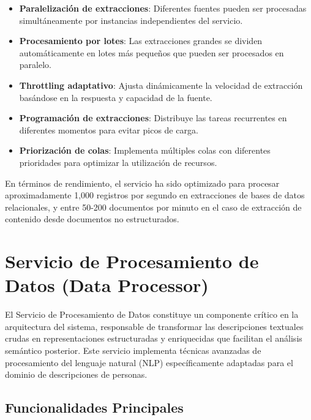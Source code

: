 \documentclass[12pt,a4paper]{article}
\begin{document}
\begin{itemize}
    \item \textbf{Paralelización de extracciones}: Diferentes fuentes pueden ser procesadas simultáneamente por instancias independientes del servicio.
    
    \item \textbf{Procesamiento por lotes}: Las extracciones grandes se dividen automáticamente en lotes más pequeños que pueden ser procesados en paralelo.
    
    \item \textbf{Throttling adaptativo}: Ajusta dinámicamente la velocidad de extracción basándose en la respuesta y capacidad de la fuente.
    
    \item \textbf{Programación de extracciones}: Distribuye las tareas recurrentes en diferentes momentos para evitar picos de carga.
    
    \item \textbf{Priorización de colas}: Implementa múltiples colas con diferentes prioridades para optimizar la utilización de recursos.
\end{itemize}

En términos de rendimiento, el servicio ha sido optimizado para procesar aproximadamente 1,000 registros por segundo en extracciones de bases de datos relacionales, y entre 50-200 documentos por minuto en el caso de extracción de contenido desde documentos no estructurados.






\section{Servicio de Procesamiento de Datos (Data Processor)}
\label{sec:data-processor}

El Servicio de Procesamiento de Datos constituye un componente crítico en la arquitectura del sistema, responsable de transformar las descripciones textuales crudas en representaciones estructuradas y enriquecidas que facilitan el análisis semántico posterior. Este servicio implementa técnicas avanzadas de procesamiento del lenguaje natural (NLP) específicamente adaptadas para el dominio de descripciones de personas.

\subsection{Funcionalidades Principales}
\label{subsec:dp-funcionalidades}
\end{document}
